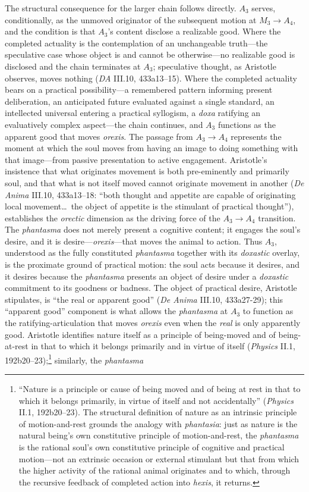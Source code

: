 \documentclass{article}
\begin{document}
The structural consequence for the larger chain follows directly. $A_3$ serves, conditionally, as the unmoved originator of the subsequent motion at $M_3 \rightarrow A_4$, and the condition is that $A_3$'s content disclose a realizable good. Where the completed actuality is the contemplation of an unchangeable truth---the speculative case whose object is and cannot be otherwise---no realizable good is disclosed and the chain terminates at $A_3$; speculative thought, as Aristotle observes, moves nothing (\textit{DA} III.10, 433a13--15). Where the completed actuality bears on a practical possibility---a remembered pattern informing present deliberation, an anticipated future evaluated against a single standard, an intellected universal entering a practical syllogism, a \textit{doxa} ratifying an evaluatively complex aspect---the chain continues, and $A_3$ functions as the apparent good that moves \textit{orexis}. The passage from $A_3 \to A_4$ represents the moment at which the soul moves from having an image to doing something with that image---from passive presentation to active engagement. Aristotle's insistence that what originates movement is both pre-eminently and primarily soul, and that what is not itself moved cannot originate movement in another (\textit{De Anima} III.10, 433a13--18: ``both thought and appetite are capable of originating local movement\ldots\ the object of appetite is the stimulant of practical thought''), establishes the \textit{orectic} dimension as the driving force of the $A_3 \to A_4$ transition. The \textit{phantasma} does not merely present a cognitive content; it engages the soul's desire, and it is desire---\textit{orexis}---that moves the animal to action. Thus $A_3$, understood as the fully constituted \textit{phantasma} together with its \textit{doxastic} overlay, is the proximate ground of practical motion: the soul acts because it desires, and it desires because the \textit{phantasma} presents an object of desire under a \textit{doxastic} commitment to its goodness or badness. The object of practical desire, Aristotle stipulates, is ``the real or apparent good'' (\textit{De Anima} III.10, 433a27-29); this ``apparent good'' component is what allows the \textit{phantasma} at $A_3$ to function as the ratifying-articulation that moves \textit{orexis} even when the \textit{real} is only apparently good. Aristotle identifies nature itself as a principle of being-moved and of being-at-rest in that to which it belongs primarily and in virtue of itself (\textit{Physics} II.1, 192b20--23);\footnote{``Nature is a principle or cause of being moved and of being at rest in that to which it belongs primarily, in virtue of itself and not accidentally'' (\textit{Physics} II.1, 192b20--23). The structural definition of nature as an intrinsic principle of motion-and-rest grounds the analogy with \textit{phantasia}: just as nature is the natural being's own constitutive principle of motion-and-rest, the \textit{phantasma} is the rational soul's own constitutive principle of cognitive and practical motion---not an extrinsic occasion or external stimulant but that from which the higher activity of the rational animal originates and to which, through the recursive feedback of completed action into \textit{hexis}, it returns.} similarly, the \textit{phantasma} 
\end{document}
